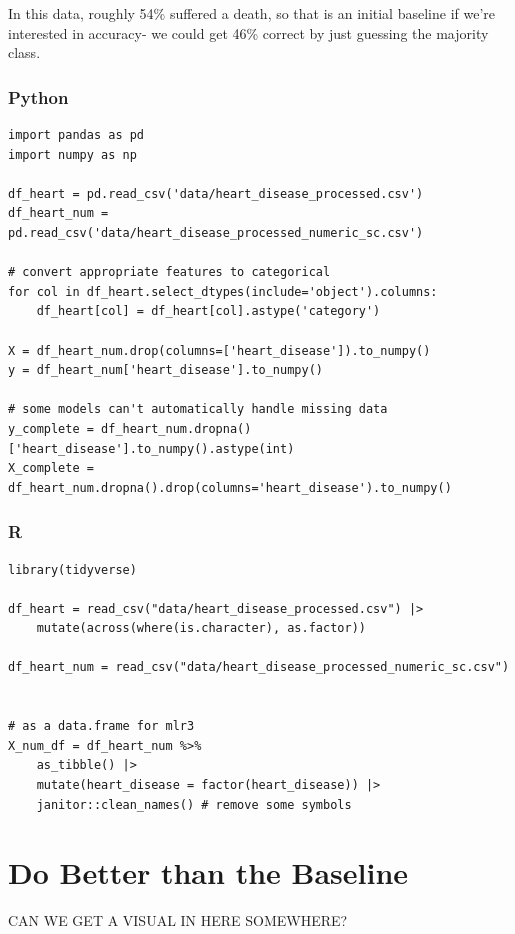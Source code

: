 \documentclass[
  letterpaper,
]{krantz}
\begin{document}
In this data, roughly 54\% suffered a death, so that is an initial
baseline if we're interested in accuracy- we could get 46\% correct by
just guessing the majority class.

\subsubsection{Python}

\begin{verbatim}
import pandas as pd
import numpy as np

df_heart = pd.read_csv('data/heart_disease_processed.csv')
df_heart_num = pd.read_csv('data/heart_disease_processed_numeric_sc.csv')

# convert appropriate features to categorical
for col in df_heart.select_dtypes(include='object').columns:
    df_heart[col] = df_heart[col].astype('category')

X = df_heart_num.drop(columns=['heart_disease']).to_numpy()
y = df_heart_num['heart_disease'].to_numpy()

# some models can't automatically handle missing data
y_complete = df_heart_num.dropna()['heart_disease'].to_numpy().astype(int)
X_complete = df_heart_num.dropna().drop(columns='heart_disease').to_numpy()
\end{verbatim}

\subsubsection{R}

\begin{verbatim}
library(tidyverse)

df_heart = read_csv("data/heart_disease_processed.csv") |> 
    mutate(across(where(is.character), as.factor))

df_heart_num = read_csv("data/heart_disease_processed_numeric_sc.csv")


# as a data.frame for mlr3
X_num_df = df_heart_num %>%
    as_tibble() |> 
    mutate(heart_disease = factor(heart_disease)) |> 
    janitor::clean_names() # remove some symbols
\end{verbatim}

\section{Do Better than the Baseline}\label{do-better-than-the-baseline}

CAN WE GET A VISUAL IN HERE SOMEWHERE?
\end{document}
